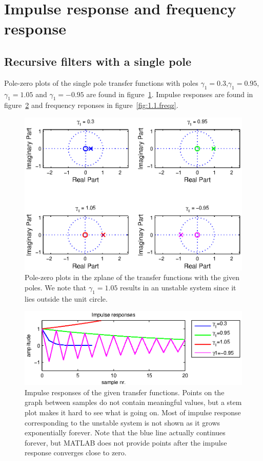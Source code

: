 \section{Impulse response and frequency response}
\subsection{Recursive filters with a single pole\\}
Pole-zero plots of the single pole transfer functions with poles \(\gamma_1=0.3\),\(\gamma_1=0.95\),\(\gamma_1=1.05\) and \(\gamma_1=-0.95\) are found in figure~\ref{fig:1.1.zplane}.
Impulse responses are found in figure~\ref{fig:1.1.impz} and frequency reponses in figure~\ref{fig:1.1.freqz}.
\begin{figure}
	\center
	\includegraphics{./picture/ha6_1_1_zplane.eps}
	\caption{Pole-zero plots in the zplane of the transfer functions with the given poles. We note that \(\gamma_1=1.05\) results in an unstable system since it lies outside the unit circle.}
	\label{fig:1.1.zplane}
\end{figure}

\begin{figure}
	\center
	\includegraphics{./picture/ha6_1_1_impz.eps}
	\caption{Impulse responses of the given transfer functions. Points on the graph between samples do not contain meaningful values, but a stem plot makes it hard to see what is going on. Most of impulse response corresponding to the unstable system is not shown as it grows exponentially forever. Note that the blue line actually continues forever, but MATLAB does not provide points after the impulse response converges close to zero.}
	\label{fig:1.1.impz}
\end{figure}

